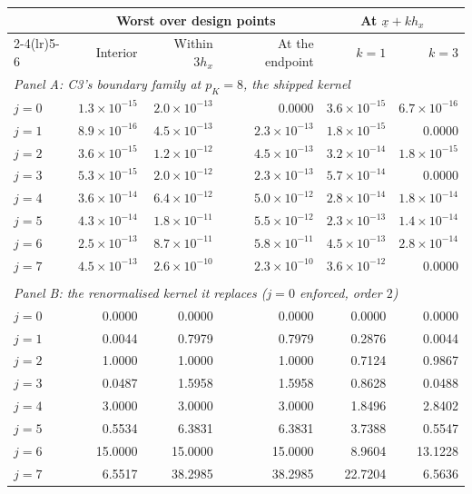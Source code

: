 \begin{tabular}{lrrrrr}
\toprule
 & \multicolumn{3}{c}{Worst over design points} & \multicolumn{2}{c}{At $\underline x + kh_x$} \\
\cmidrule(lr){2-4}\cmidrule(lr){5-6}
 & Interior & Within $3h_x$ & At the endpoint & $k=1$ & $k=3$ \\
\midrule
\multicolumn{6}{l}{\textit{Panel A: C3's boundary family at $p_K=8$, the shipped kernel}} \\
$j=0$ & $1.3 \times 10^{-15}$ & $2.0 \times 10^{-13}$ & 0.0000 & $3.6 \times 10^{-15}$ & $6.7 \times 10^{-16}$ \\
$j=1$ & $8.9 \times 10^{-16}$ & $4.5 \times 10^{-13}$ & $2.3 \times 10^{-13}$ & $1.8 \times 10^{-15}$ & 0.0000 \\
$j=2$ & $3.6 \times 10^{-15}$ & $1.2 \times 10^{-12}$ & $4.5 \times 10^{-13}$ & $3.2 \times 10^{-14}$ & $1.8 \times 10^{-15}$ \\
$j=3$ & $5.3 \times 10^{-15}$ & $2.0 \times 10^{-12}$ & $2.3 \times 10^{-13}$ & $5.7 \times 10^{-14}$ & 0.0000 \\
$j=4$ & $3.6 \times 10^{-14}$ & $6.4 \times 10^{-12}$ & $5.0 \times 10^{-12}$ & $2.8 \times 10^{-14}$ & $1.8 \times 10^{-14}$ \\
$j=5$ & $4.3 \times 10^{-14}$ & $1.8 \times 10^{-11}$ & $5.5 \times 10^{-12}$ & $2.3 \times 10^{-13}$ & $1.4 \times 10^{-14}$ \\
$j=6$ & $2.5 \times 10^{-13}$ & $8.7 \times 10^{-11}$ & $5.8 \times 10^{-11}$ & $4.5 \times 10^{-13}$ & $2.8 \times 10^{-14}$ \\
$j=7$ & $4.5 \times 10^{-13}$ & $2.6 \times 10^{-10}$ & $2.3 \times 10^{-10}$ & $3.6 \times 10^{-12}$ & 0.0000 \\
\\[0.5em]
\multicolumn{6}{l}{\textit{Panel B: the renormalised kernel it replaces ($j=0$ enforced, order $2$)}} \\
$j=0$ & 0.0000 & 0.0000 & 0.0000 & 0.0000 & 0.0000 \\
$j=1$ & 0.0044 & 0.7979 & 0.7979 & 0.2876 & 0.0044 \\
$j=2$ & 1.0000 & 1.0000 & 1.0000 & 0.7124 & 0.9867 \\
$j=3$ & 0.0487 & 1.5958 & 1.5958 & 0.8628 & 0.0488 \\
$j=4$ & 3.0000 & 3.0000 & 3.0000 & 1.8496 & 2.8402 \\
$j=5$ & 0.5534 & 6.3831 & 6.3831 & 3.7388 & 0.5547 \\
$j=6$ & 15.0000 & 15.0000 & 15.0000 & 8.9604 & 13.1228 \\
$j=7$ & 6.5517 & 38.2985 & 38.2985 & 22.7204 & 6.5636 \\
\bottomrule
\end{tabular}

